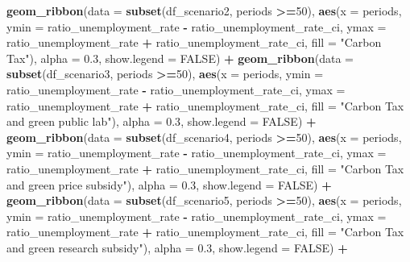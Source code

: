 \documentclass[
]{article}
\newenvironment{Shaded}{\begin{snugshade}}{\end{snugshade}}
\newcommand{\AttributeTok}[1]{\textcolor[rgb]{0.13,0.29,0.53}{#1}}
\newcommand{\ConstantTok}[1]{\textcolor[rgb]{0.56,0.35,0.01}{#1}}
\newcommand{\DecValTok}[1]{\textcolor[rgb]{0.00,0.00,0.81}{#1}}
\newcommand{\FloatTok}[1]{\textcolor[rgb]{0.00,0.00,0.81}{#1}}
\newcommand{\FunctionTok}[1]{\textcolor[rgb]{0.13,0.29,0.53}{\textbf{#1}}}
\newcommand{\NormalTok}[1]{#1}
\newcommand{\SpecialCharTok}[1]{\textcolor[rgb]{0.81,0.36,0.00}{\textbf{#1}}}
\newcommand{\StringTok}[1]{\textcolor[rgb]{0.31,0.60,0.02}{#1}}
\begin{document}
\begin{Shaded}
\begin{Highlighting}[]
  \FunctionTok{geom\_ribbon}\NormalTok{(}\AttributeTok{data =} \FunctionTok{subset}\NormalTok{(df\_scenario2, periods }\SpecialCharTok{\textgreater{}=}\DecValTok{50}\NormalTok{), }\FunctionTok{aes}\NormalTok{(}\AttributeTok{x =}\NormalTok{ periods, }\AttributeTok{ymin =}\NormalTok{ ratio\_unemployment\_rate }\SpecialCharTok{{-}}\NormalTok{ ratio\_unemployment\_rate\_ci, }\AttributeTok{ymax =}\NormalTok{ ratio\_unemployment\_rate }\SpecialCharTok{+}\NormalTok{ ratio\_unemployment\_rate\_ci, }\AttributeTok{fill =} \StringTok{"Carbon Tax"}\NormalTok{), }\AttributeTok{alpha =} \FloatTok{0.3}\NormalTok{, }\AttributeTok{show.legend =} \ConstantTok{FALSE}\NormalTok{) }\SpecialCharTok{+}
  \FunctionTok{geom\_ribbon}\NormalTok{(}\AttributeTok{data =} \FunctionTok{subset}\NormalTok{(df\_scenario3, periods }\SpecialCharTok{\textgreater{}=}\DecValTok{50}\NormalTok{), }\FunctionTok{aes}\NormalTok{(}\AttributeTok{x =}\NormalTok{ periods, }\AttributeTok{ymin =}\NormalTok{ ratio\_unemployment\_rate }\SpecialCharTok{{-}}\NormalTok{ ratio\_unemployment\_rate\_ci, }\AttributeTok{ymax =}\NormalTok{ ratio\_unemployment\_rate }\SpecialCharTok{+}\NormalTok{ ratio\_unemployment\_rate\_ci, }\AttributeTok{fill =} \StringTok{"Carbon Tax and green public lab"}\NormalTok{), }\AttributeTok{alpha =} \FloatTok{0.3}\NormalTok{, }\AttributeTok{show.legend =} \ConstantTok{FALSE}\NormalTok{) }\SpecialCharTok{+}
  \FunctionTok{geom\_ribbon}\NormalTok{(}\AttributeTok{data =} \FunctionTok{subset}\NormalTok{(df\_scenario4, periods }\SpecialCharTok{\textgreater{}=}\DecValTok{50}\NormalTok{), }\FunctionTok{aes}\NormalTok{(}\AttributeTok{x =}\NormalTok{ periods, }\AttributeTok{ymin =}\NormalTok{ ratio\_unemployment\_rate }\SpecialCharTok{{-}}\NormalTok{ ratio\_unemployment\_rate\_ci, }\AttributeTok{ymax =}\NormalTok{ ratio\_unemployment\_rate }\SpecialCharTok{+}\NormalTok{ ratio\_unemployment\_rate\_ci, }\AttributeTok{fill =} \StringTok{"Carbon Tax and green price subsidy"}\NormalTok{), }\AttributeTok{alpha =} \FloatTok{0.3}\NormalTok{, }\AttributeTok{show.legend =} \ConstantTok{FALSE}\NormalTok{) }\SpecialCharTok{+}
  \FunctionTok{geom\_ribbon}\NormalTok{(}\AttributeTok{data =} \FunctionTok{subset}\NormalTok{(df\_scenario5, periods }\SpecialCharTok{\textgreater{}=}\DecValTok{50}\NormalTok{), }\FunctionTok{aes}\NormalTok{(}\AttributeTok{x =}\NormalTok{ periods, }\AttributeTok{ymin =}\NormalTok{ ratio\_unemployment\_rate }\SpecialCharTok{{-}}\NormalTok{ ratio\_unemployment\_rate\_ci, }\AttributeTok{ymax =}\NormalTok{ ratio\_unemployment\_rate }\SpecialCharTok{+}\NormalTok{ ratio\_unemployment\_rate\_ci, }\AttributeTok{fill =} \StringTok{"Carbon Tax and green research subsidy"}\NormalTok{), }\AttributeTok{alpha =} \FloatTok{0.3}\NormalTok{, }\AttributeTok{show.legend =} \ConstantTok{FALSE}\NormalTok{) }\SpecialCharTok{+}

\end{Highlighting}
\end{Shaded}
\end{document}
